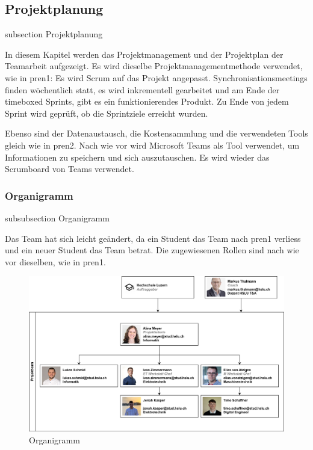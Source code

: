 \subsection*{Projektplanung}
\label{projektplanung}
    {subsection}
    {Projektplanung}

In diesem Kapitel werden das Projektmanagement und der Projektplan der Teamarbeit aufgezeigt.
Es wird dieselbe Projektmanagementmethode verwendet, wie in \acrfull{pren1}: Es wird Scrum auf das Projekt angepasst. Synchronisationsmeetings finden wöchentlich statt, es wird inkrementell gearbeitet und am Ende der timeboxed Sprints, gibt es ein funktionierendes Produkt. Zu Ende von jedem Sprint wird geprüft, ob die Sprintziele erreicht wurden.\cite{wikipedia-scrum}

Ebenso sind der Datenaustausch, die Kostensammlung und die verwendeten Tools gleich wie in \acrshort{pren2}. Nach wie vor wird Microsoft Teams als Tool verwendet, um Informationen zu speichern und sich auszutauschen. Es wird wieder das Scrumboard von Teams verwendet.

\subsubsection*{Organigramm}
    {subsubsection}
    {Organigramm}

Das Team hat sich leicht geändert, da ein Student das Team nach \acrshort{pren1} verliess und ein neuer Student das Team betrat. Die zugewiesenen Rollen sind nach wie vor dieselben, wie in \acrshort{pren1}.

\begin{figure}[H]
\centering
\includegraphics[width=\textwidth]{assets/projektmanagement/Organigramm.png}
\caption{Organigramm}
\label{fig:organigram}
\end{figure}

